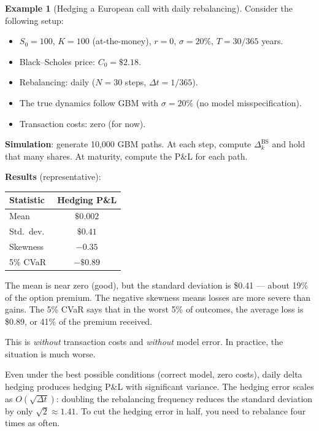 \documentclass[11pt, a4paper]{article}
\theoremstyle{definition}
\newtheorem{example}{Example}[section]
\theoremstyle{plain}
\theoremstyle{remark}
\begin{document}
\begin{example}[Hedging a European call with daily rebalancing]\label{ex:daily-hedge}
Consider the following setup:
\begin{itemize}
    \item $S_0 = 100$, $K = 100$ (at-the-money), $r = 0$, $\sigma = 20\%$, $T = 30/365$ years.
    \item Black--Scholes price: $C_0 = \$2.18$.
    \item Rebalancing: daily ($N = 30$ steps, $\Delta t = 1/365$).
    \item The true dynamics follow GBM with $\sigma = 20\%$ (no model misspecification).
    \item Transaction costs: zero (for now).
\end{itemize}

\textbf{Simulation}: generate 10{,}000 GBM paths.
At each step, compute $\Delta_k^{\text{BS}}$ and hold that many shares.
At maturity, compute the P\&L for each path.

\textbf{Results} (representative):
\begin{center}
\begin{tabular}{@{}lc@{}}
\toprule
\textbf{Statistic} & \textbf{Hedging P\&L} \\
\midrule
Mean      & $\$0.002$ \\
Std.\ dev.\ & $\$0.41$ \\
Skewness  & $-0.35$ \\
5\% CVaR  & $-\$0.89$ \\
\bottomrule
\end{tabular}
\end{center}

The mean is near zero (good), but the standard deviation is \$0.41 --- about 19\%
of the option premium.
The negative skewness means losses are more severe than gains.
The 5\% CVaR says that in the worst 5\% of outcomes, the average loss is \$0.89,
or 41\% of the premium received.

This is \emph{without} transaction costs and \emph{without} model error.
In practice, the situation is much worse.
\end{example}

\begin{keyresult}
Even under the best possible conditions (correct model, zero costs), daily delta hedging
produces hedging P\&L with significant variance.
The hedging error scales as $O(\sqrt{\Delta t})$: doubling the rebalancing frequency
reduces the standard deviation by only $\sqrt{2} \approx 1.41$.
To cut the hedging error in half, you need to rebalance four times as often.
\end{keyresult}
\end{document}
